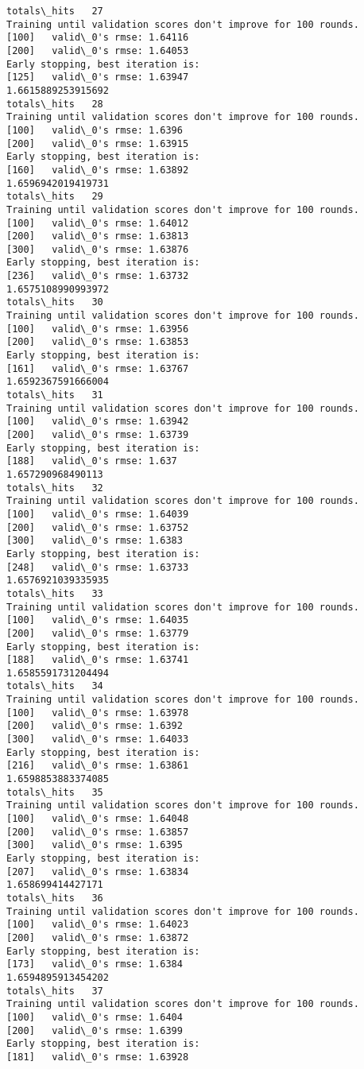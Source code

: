 \documentclass[11pt]{article}
\begin{document}
\begin{Verbatim}[commandchars=\\\{\}]
totals\_hits   27
Training until validation scores don't improve for 100 rounds.
[100]	valid\_0's rmse: 1.64116
[200]	valid\_0's rmse: 1.64053
Early stopping, best iteration is:
[125]	valid\_0's rmse: 1.63947
1.6615889253915692
totals\_hits   28
Training until validation scores don't improve for 100 rounds.
[100]	valid\_0's rmse: 1.6396
[200]	valid\_0's rmse: 1.63915
Early stopping, best iteration is:
[160]	valid\_0's rmse: 1.63892
1.6596942019419731
totals\_hits   29
Training until validation scores don't improve for 100 rounds.
[100]	valid\_0's rmse: 1.64012
[200]	valid\_0's rmse: 1.63813
[300]	valid\_0's rmse: 1.63876
Early stopping, best iteration is:
[236]	valid\_0's rmse: 1.63732
1.6575108990993972
totals\_hits   30
Training until validation scores don't improve for 100 rounds.
[100]	valid\_0's rmse: 1.63956
[200]	valid\_0's rmse: 1.63853
Early stopping, best iteration is:
[161]	valid\_0's rmse: 1.63767
1.6592367591666004
totals\_hits   31
Training until validation scores don't improve for 100 rounds.
[100]	valid\_0's rmse: 1.63942
[200]	valid\_0's rmse: 1.63739
Early stopping, best iteration is:
[188]	valid\_0's rmse: 1.637
1.657290968490113
totals\_hits   32
Training until validation scores don't improve for 100 rounds.
[100]	valid\_0's rmse: 1.64039
[200]	valid\_0's rmse: 1.63752
[300]	valid\_0's rmse: 1.6383
Early stopping, best iteration is:
[248]	valid\_0's rmse: 1.63733
1.6576921039335935
totals\_hits   33
Training until validation scores don't improve for 100 rounds.
[100]	valid\_0's rmse: 1.64035
[200]	valid\_0's rmse: 1.63779
Early stopping, best iteration is:
[188]	valid\_0's rmse: 1.63741
1.6585591731204494
totals\_hits   34
Training until validation scores don't improve for 100 rounds.
[100]	valid\_0's rmse: 1.63978
[200]	valid\_0's rmse: 1.6392
[300]	valid\_0's rmse: 1.64033
Early stopping, best iteration is:
[216]	valid\_0's rmse: 1.63861
1.6598853883374085
totals\_hits   35
Training until validation scores don't improve for 100 rounds.
[100]	valid\_0's rmse: 1.64048
[200]	valid\_0's rmse: 1.63857
[300]	valid\_0's rmse: 1.6395
Early stopping, best iteration is:
[207]	valid\_0's rmse: 1.63834
1.658699414427171
totals\_hits   36
Training until validation scores don't improve for 100 rounds.
[100]	valid\_0's rmse: 1.64023
[200]	valid\_0's rmse: 1.63872
Early stopping, best iteration is:
[173]	valid\_0's rmse: 1.6384
1.6594895913454202
totals\_hits   37
Training until validation scores don't improve for 100 rounds.
[100]	valid\_0's rmse: 1.6404
[200]	valid\_0's rmse: 1.6399
Early stopping, best iteration is:
[181]	valid\_0's rmse: 1.63928

\end{Verbatim}
\end{document}
